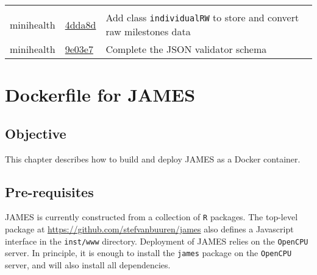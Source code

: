 \documentclass[]{book}
\begin{document}
\begin{longtable}[]{@{}lll@{}}
\begin{minipage}[t]{0.36\columnwidth}
\end{minipage}\tabularnewline
\begin{minipage}[t]{0.26\columnwidth}\raggedright
minihealth\strut
\end{minipage} & \begin{minipage}[t]{0.29\columnwidth}\raggedright
\href{https://github.com/stefvanbuuren/minihealth/commit/4dda8daabca8811a4cc321c66aaccf31c4aba83f}{4dda8d}\strut
\end{minipage} & \begin{minipage}[t]{0.36\columnwidth}\raggedright
Add class \texttt{individualRW} to store and convert raw milestones data\strut
\end{minipage}\tabularnewline
\begin{minipage}[t]{0.26\columnwidth}\raggedright
minihealth\strut
\end{minipage} & \begin{minipage}[t]{0.29\columnwidth}\raggedright
\href{https://github.com/stefvanbuuren/minihealth/commit/9e03e7e39b007a9687d21efbaa13e77283866d5c}{9e03e7}\strut
\end{minipage} & \begin{minipage}[t]{0.36\columnwidth}\raggedright
Complete the JSON validator schema\strut
\end{minipage}\tabularnewline
\bottomrule
\end{longtable}

\hypertarget{dockerfile-for-james}{%
\chapter{Dockerfile for JAMES}\label{dockerfile-for-james}}

\hypertarget{objective-1}{%
\section{Objective}\label{objective-1}}

This chapter describes how to build and deploy JAMES as a Docker container.

\hypertarget{pre-requisites}{%
\section{Pre-requisites}\label{pre-requisites}}

JAMES is currently constructed from a collection of \texttt{R} packages. The top-level package at \url{https://github.com/stefvanbuuren/james} also defines a Javascript interface in the \texttt{inst/www} directory. Deployment of JAMES relies on the \texttt{OpenCPU} server. In principle, it is enough to install the \texttt{james} package on the \texttt{OpenCPU} server, and will also install all dependencies.
\end{document}
